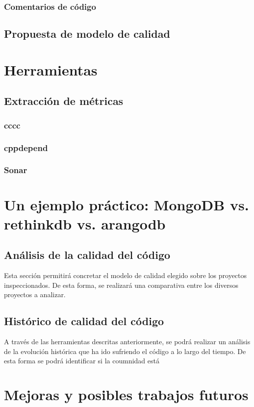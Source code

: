 \documentclass[11pt]{article}
\begin{document}
\subsubsection{Comentarios de código}

\subsection{Propuesta de modelo de calidad}

\section{Herramientas}

\subsection{Extracción de métricas}

\subsubsection{cccc}

\subsubsection{cppdepend}

\subsubsection{Sonar}

\section{Un ejemplo práctico: MongoDB vs. rethinkdb vs. arangodb}

\subsection{Análisis de la calidad del código}

Esta sección permitirá concretar el modelo de calidad elegido sobre los proyectos inspeccionados. De esta forma, se realizará una comparativa entre los diversos proyectos a analizar.

\subsection{Histórico de calidad del código}

A través de las herramientas descritas anteriormente, se podrá realizar un análisis de la evolución histórica que ha ido sufriendo el código a lo largo del tiempo. De esta forma se podrá identificar si la coumnidad está 

\section{Mejoras y posibles trabajos futuros}

\pagebreak



\label{Bibliography}
\end{document}
